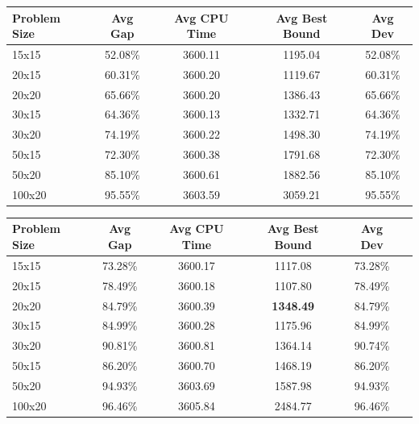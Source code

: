 \documentclass{mimosis}
\begin{document}
\begin{table}[h]
\centering
\begin{tabular}{lcccc}
Problem Size & Avg Gap & Avg CPU Time & Avg Best Bound & Avg Dev \\
\hline
15x15 & 52.08\% & 3600.11 & 1195.04 & 52.08\% \\
20x15 & 60.31\% & 3600.20 & 1119.67 & 60.31\% \\
20x20 & 65.66\% & 3600.20 & 1386.43 & 65.66\% \\
30x15 & 64.36\% & 3600.13 & 1332.71 & 64.36\% \\
30x20 & 74.19\% & 3600.22 & 1498.30 & 74.19\% \\
50x15 & 72.30\% & 3600.38 & 1791.68 & 72.30\% \\
50x20 & 85.10\% & 3600.61 & 1882.56 & 85.10\% \\
100x20 & 95.55\% & 3603.59 & 3059.21 & 95.55\% \\
\end{tabular}
\label{tab:results_prob02}
\end{table}

\begin{table}[h]
\centering
\begin{tabular}{lccccc}
Problem Size & Avg Gap & Avg CPU Time & Avg Best Bound & Avg Dev \\
\hline
15x15 & 73.28\% & 3600.17 & 1117.08 & 73.28\% \\
20x15 & 78.49\% & 3600.18 & 1107.80 & 78.49\% \\
20x20 & 84.79\% & 3600.39 & \textbf{1348.49} & 84.79\% \\
30x15 & 84.99\% & 3600.28 & 1175.96 & 84.99\% \\
30x20 & 90.81\% & 3600.81 & 1364.14 & 90.74\% \\
50x15 & 86.20\% & 3600.70 & 1468.19 & 86.20\% \\
50x20 & 94.93\% & 3603.69 & 1587.98 & 94.93\% \\
100x20 & 96.46\% & 3605.84 & 2484.77 & 96.46\% \\
\end{tabular}
\label{tab:results_prob05}
\end{table}
\end{document}
